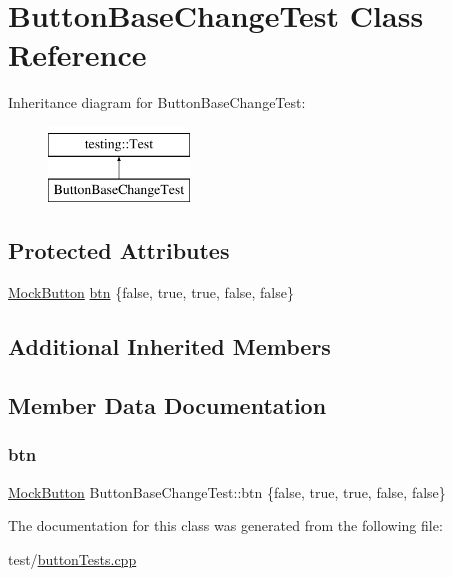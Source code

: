 \hypertarget{classButtonBaseChangeTest}{}\section{Button\+Base\+Change\+Test Class Reference}
\label{classButtonBaseChangeTest}
Inheritance diagram for Button\+Base\+Change\+Test\+:\begin{figure}[H]
\begin{center}
\leavevmode
\includegraphics[height=2.000000cm]{classButtonBaseChangeTest}
\end{center}
\end{figure}
\subsection*{Protected Attributes}
\begin{DoxyCompactItemize}
\item 
\mbox{\hyperlink{classMockButton}{Mock\+Button}} \mbox{\hyperlink{classButtonBaseChangeTest_a8f01e954d278a8a3295851f722ce0785}{btn}} \{false, true, true, false, false\}
\end{DoxyCompactItemize}
\subsection*{Additional Inherited Members}


\subsection{Member Data Documentation}
\mbox{\label{classButtonBaseChangeTest_a8f01e954d278a8a3295851f722ce0785}} 
\subsubsection{\texorpdfstring{btn}{btn}}
{\footnotesize\ttfamily \mbox{\hyperlink{classMockButton}{Mock\+Button}} Button\+Base\+Change\+Test\+::btn \{false, true, true, false, false\}\hspace{0.3cm}{\ttfamily [protected]}}



The documentation for this class was generated from the following file\+:\begin{DoxyCompactItemize}
\item 
test/\mbox{\hyperlink{buttonTests_8cpp}{button\+Tests.\+cpp}}\end{DoxyCompactItemize}
